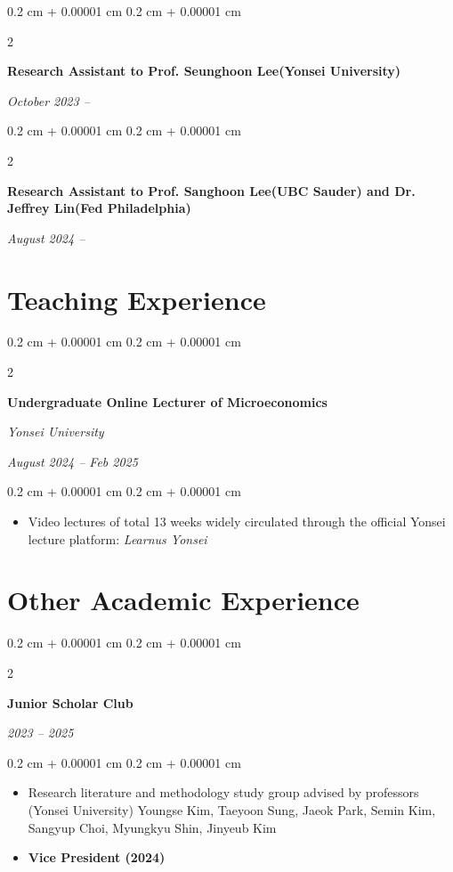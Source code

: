 \documentclass[10pt, letterpaper]{article}
\newenvironment{highlights}{
	\begin{itemize}[
		topsep=0.10 cm,
		parsep=0.10 cm,
		partopsep=0pt,
		itemsep=0pt,
		leftmargin=0.4 cm + 10pt
		]
	}{
	\end{itemize}
} %
\newenvironment{onecolentry}{
	\begin{adjustwidth}{
			0.2 cm + 0.00001 cm
		}{
			0.2 cm + 0.00001 cm
		}
	}{
	\end{adjustwidth}
} %
\newenvironment{twocolentry}[2][]{
	\onecolentry
	\def\secondColumn{#2}
	\setcolumnwidth{\fill, 4.5 cm}
	\begin{paracol}{2}
	}{
		\switchcolumn \raggedleft \secondColumn
	\end{paracol}
	\endonecolentry
} %
\begin{document}
			\begin{twocolentry}{
			\textit{October 2023 –}    }
		\textbf{Research Assistant to Prof. Seunghoon Lee(Yonsei University)}
		
	\end{twocolentry}
	
\vspace{12pt}
				\begin{twocolentry}{
			\textit{August 2024 –}    
			}
		\textbf{Research Assistant to Prof. Sanghoon Lee(UBC Sauder) and Dr. Jeffrey Lin(Fed Philadelphia)}
		
	\end{twocolentry}
	
\vspace{12pt}

	
	
	
	\section{Teaching Experience}
		\begin{twocolentry}{
			\textit{August 2024 – Feb 2025}    
			
			\textit{}}
		\textbf{Undergraduate Online Lecturer of Microeconomics}
		
		\textit{Yonsei University}
	\end{twocolentry}
	
	\vspace{0.10 cm}
	\begin{onecolentry}
		\begin{highlights}
			\item Video lectures of total 13 weeks widely circulated through the official Yonsei lecture platform: \textit{Learnus Yonsei}
		\end{highlights}
	\end{onecolentry}
	
	\vspace{12pt}
	
\section{Other Academic Experience}
	
	\begin{twocolentry}{
			
			
			\textit{2023 – 2025}}
		\textbf{Junior Scholar Club}
	\end{twocolentry}
	
	\vspace{0.10 cm}
	\begin{onecolentry}
	\begin{highlights}
		\item Research literature and methodology study group advised by professors (Yonsei University) Youngse Kim, Taeyoon Sung, Jaeok Park, Semin Kim, Sangyup Choi, Myungkyu Shin, Jinyeub Kim
		\item \textbf{Vice President (2024)}
	\end{highlights}
\end{onecolentry}
	
\end{document}
